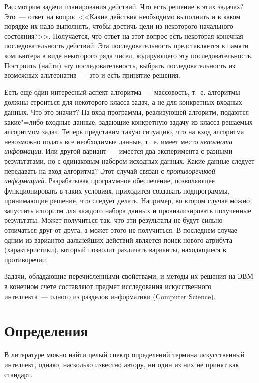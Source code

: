 \documentclass[a4paper,14pt, openany, twoside, draft]{extbook} %
\begin{document}
Рассмотрим задачи планирования действий. Что есть решение в этих задачах? Это~--- ответ на вопрос <<Какие действия необходимо выполнить и в каком порядке их надо выполнять, чтобы достичь цели из некоторого начального состояния?>>. Получается, что ответ на этот вопрос есть некоторая конечная последовательность действий. Эта последовательность представляется в памяти компьютера в виде некоторого ряда чисел, кодирующего эту последовательность. Построить (найти) эту последовательность, выбрать последовательность из возможных альтернатив~--- это и есть принятие решения.

Есть еще один интересный аспект алгоритма~--- массовость, т.~е. алгоритмы должны строиться для некоторого класса задач, а не для конкретных входных данных. Что это значит? На вход программы, реализующей алгоритм, подаются какие"=либо входные данные, задающие конкретную задачу из класса решаемых алгоритмом задач. Теперь представим такую ситуацию, что на вход алгоритма невозможно подать все необходимые данные, т.~е. имеет место \emph{неполнота информации}. Или другой вариант~--- имеется два эксперимента с разными результатами, но с одинаковым набором исходных данных. Какие данные следует передавать на вход алгоритма? Этот случай связан с \emph{противоречивой информацией}. Разрабатывая программное обеспечение, позволяющее функционировать в таких условиях, приходится создавать подпрограммы, принимающие решение, что следует делать. Например, во втором случае можно запустить алгоритм для каждого набора данных и проанализировать полученные результаты. Может получиться так, что эти результаты не будут сильно отличаться друг от друга, а может этого не получиться. В последнем случае одним из вариантов дальнейших действий является поиск нового атрибута (характеристики), который позволит различать варианты, находящиеся в противоречии.

Задачи,  обладающие перечисленными свойствами, и методы их решения на ЭВМ в конечном счете составляют предмет исследования искусственного интеллекта~--- одного из разделов информатики (Computer Science).

\section{Определения}

В литературе можно найти целый спектр определений термина искусственный интеллект, однако, насколько известно автору, ни один из них не принят как стандарт.
\end{document}
